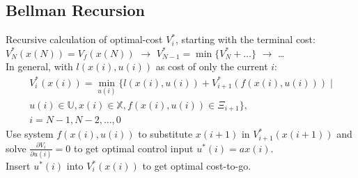 \documentclass[english]{latex4ei/latex4ei_sheet}
\begin{document}
\begin{sectionbox}
\subsection{Bellman Recursion}
Recursive calculation of optimal-cost $V_i^*$, starting with the terminal cost: \\
$V_{N}^{*}(x(N))=V_f(x(N))$ \; $\rightarrow$ \; $V_{N-1}^{*}=\min\{V^{*}_N+\ldots\}$ \; $\rightarrow$ \;\ldots\\
In general, with $l(x(i),u(i))$ as cost of only the current $i$:
\begin{multline*}
V_{i}^{*}(x(i))=\min _{u(i)}\Big\{l(x(i), u(i))+V_{i+1}^{*}\left(f(x(i), u(i))\right) \;| \\u(i) \in \mathbb{U}, x(i) \in \mathbb{X}, f(x(i), u(i)) \in \Xi_{i+1}\Big\},\\
i=N-1,N-2,\ldots,0
\end{multline*}
Use system $f(x(i),u(i))$ to substitute $x(i+1)$ in $V^{*}_{i+1}(x(i+1))$ and solve $\frac{\partial V_{i}}{\partial u(i)}=0$ to get optimal control input $u^{*}(i)=ax(i)$.\\ Insert $u^{*}(i)$ into $V^{*}_{i}(x(i))$ to get optimal cost-to-go.

\end{sectionbox}
\end{document}
